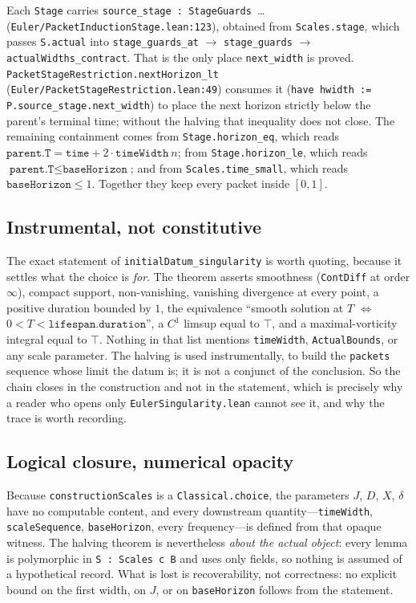 \documentclass[11pt]{article}
\newcommand{\ct}[1]{\texttt{#1}}
\newcommand{\file}[1]{\texttt{\small #1}}
\theoremstyle{plain}
\theoremstyle{definition}
\theoremstyle{remark}
\begin{document}
Each \ct{Stage} carries \ct{source\_stage : StageGuards}\ \dots
(\file{Euler/PacketInductionStage.lean:123}), obtained from \ct{Scales.stage},
which passes \ct{S.actual} into \ct{stage\_guards\_at} $\to$ \ct{stage\_guards}
$\to$ \ct{actualWidths\_contract}. That is the only place
\ct{next\_width} is proved. \ct{PacketStageRestriction.nextHorizon\_lt}
(\file{Euler/PacketStageRestriction.lean:49}) consumes it
(\ct{have hwidth := P.source\_stage.next\_width}) to place the next horizon
strictly below the parent's terminal time; without the halving that inequality
does not close. The remaining containment comes from
\ct{Stage.horizon\_eq}, which reads
$\ct{parent.T}=\ct{time}+2\cdot\ct{timeWidth}\ n$; from \ct{Stage.horizon\_le},
which reads $\ct{parent.T}\le\ct{baseHorizon}$; and from \ct{Scales.time\_small},
which reads $\ct{baseHorizon}\le 1$. Together they keep every packet inside
$[0,1]$.

\subsection{Instrumental, not constitutive}

The exact statement of \ct{initialDatum\_singularity} is worth quoting, because
it settles what the choice is \emph{for}. The theorem asserts smoothness
(\ct{ContDiff} at order $\infty$), compact support, non-vanishing, vanishing divergence at
every point, a positive duration bounded by $1$, the equivalence ``smooth
solution at $T$ $\iff$ $0<T<\ct{lifespan.duration}$'', a $C^{1}$ limsup equal
to $\top$, and a maximal-vorticity integral equal to $\top$. Nothing in that
list mentions \ct{timeWidth}, \ct{ActualBounds}, or any scale parameter. The
halving is used instrumentally, to build the \ct{packets} sequence whose limit
the datum is; it is not a conjunct of the conclusion. So the chain closes in the
construction and not in the statement, which is precisely why a reader who opens
only \file{EulerSingularity.lean} cannot see it, and why the trace is worth
recording.

\subsection{Logical closure, numerical opacity}

Because \ct{constructionScales} is a \ct{Classical.choice}, the parameters
$J$, $D$, $X$, $\delta$ have no computable content, and every downstream
quantity---\ct{timeWidth}, \ct{scaleSequence}, \ct{baseHorizon}, every
frequency---is defined from that opaque witness. The halving theorem is
nevertheless \emph{about the actual object}: every lemma is polymorphic in
\ct{S : Scales c B} and uses only fields, so nothing is assumed of a
hypothetical record. What is lost is recoverability, not correctness: no
explicit bound on the first width, on $J$, or on \ct{baseHorizon} follows from
the statement.
\end{document}
